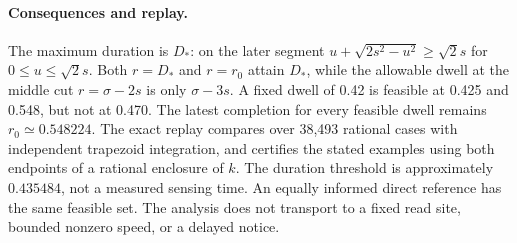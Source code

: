\documentclass{article}
\begin{document}
\paragraph{Consequences and replay.}
The maximum duration is \(D_*\): on the later segment
\(u+\sqrt{2s^2-u^2}\ge\sqrt2s\) for \(0\le u\le\sqrt2s\).
Both \(r=D_*\) and \(r=r_0\) attain \(D_*\), while the allowable
dwell at the middle cut \(r=\sigma-2s\) is only \(\sigma-3s\).
A fixed dwell of 0.42 is feasible at 0.425 and 0.548, but
not at 0.470. The latest completion for every feasible dwell
remains \(r_0\simeq0.548224\). The exact replay compares over
38,493 rational cases with independent trapezoid integration,
and certifies the stated examples using both endpoints of
a rational enclosure of \(k\). The duration threshold is
approximately \(0.435484\), not a measured sensing time.
An equally informed direct reference has the same feasible
set. The analysis does not transport to a fixed read site,
bounded nonzero speed, or a delayed notice.
\end{document}

